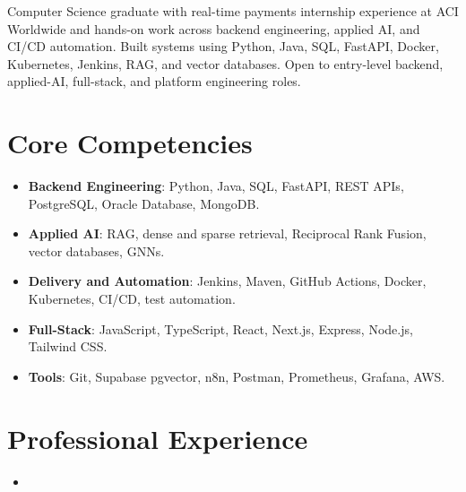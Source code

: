 \documentclass[11pt,a4paper,sans]{moderncv}
\begin{document}
\makecvtitle

\vspace{6pt}
\small{Computer Science graduate with real-time payments internship experience at ACI Worldwide and hands-on work across backend engineering, applied AI, and CI/CD automation. Built systems using Python, Java, SQL, FastAPI, Docker, Kubernetes, Jenkins, RAG, and vector databases. Open to entry-level backend, applied-AI, full-stack, and platform engineering roles.}

\section{Core Competencies}
\vspace{1pt}
\begin{itemize}
\item \textbf{Backend Engineering}: Python, Java, SQL, FastAPI, REST APIs, PostgreSQL, Oracle Database, MongoDB.
\item \textbf{Applied AI}: RAG, dense and sparse retrieval, Reciprocal Rank Fusion, vector databases, GNNs.
\item \textbf{Delivery and Automation}: Jenkins, Maven, GitHub Actions, Docker, Kubernetes, CI/CD, test automation.
\item \textbf{Full-Stack}: JavaScript, TypeScript, React, Next.js, Express, Node.js, Tailwind CSS.
\item \textbf{Tools}: Git, Supabase pgvector, n8n, Postman, Prometheus, Grafana, AWS.
\end{itemize}

\section{Professional Experience}
\vspace{3pt}
\begin{itemize}
\item{}
\end{itemize}
\end{document}
